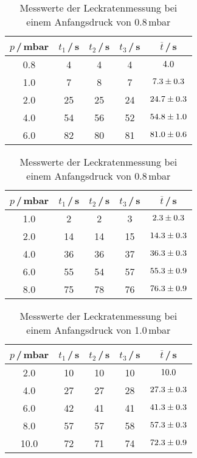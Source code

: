 \begin{table}
  \begin{minipage}{0.45\textwidth}
    \centering
    \caption{Messwerte der Leckratenmessung bei\\ einem Anfangsdruck von 0.6\,mbar}
    \begin{tabular}{c|c|c|c|c}
      $p$\,/\,mbar & $t_1$\,/\,s & $t_2$\,/\,s & $t_3$\,/\,s & $\overline{t}$\,/\,s \\
      \hline
      0.8 & 4  & 4  & 4  & $\num{4.0 +- 0.0}$ \\
      1.0 & 7  & 8  & 7  & $\num{7.3 +- 0.3}$ \\
      2.0 & 25 & 25 & 24 & $\num{24.7 +- 0.3}$ \\
      4.0 & 54 & 56 & 52 & $\num{54.8 +- 1.0}$ \\
      6.0 & 82 & 80 & 81 & $\num{81.0 +- 0.6}$ \\
    \end{tabular}
  \end{minipage}\hfill
  \begin{minipage}{0.45\textwidth}
    \centering
    \caption{Messwerte der Leckratenmessung bei\\ einem Anfangsdruck von 0.8\,mbar}
    \begin{tabular}{c|c|c|c|c}
      $p$\,/\,mbar & $t_1$\,/\,s & $t_2$\,/\,s & $t_3$\,/\,s & $\overline{t}$\,/\,s \\
      \hline
      1.0 & 2  & 2  & 3  & $\num{2.3 +- 0.3}$ \\
      2.0 & 14 & 14 & 15 & $\num{14.3 +- 0.3}$ \\
      4.0 & 36 & 36 & 37 & $\num{36.3 +- 0.3}$ \\
      6.0 & 55 & 54 & 57 & $\num{55.3 +- 0.9}$ \\
      8.0 & 75 & 78 & 76 & $\num{76.3 +- 0.9}$ \\
    \end{tabular}
  \end{minipage}
\end{table}

\begin{table}
  \centering
  \caption{Messwerte der Leckratenmessung bei\\ einem Anfangsdruck von 1.0\,mbar}
  \begin{tabular}{c|c|c|c|c}
    $p$\,/\,mbar & $t_1$\,/\,s & $t_2$\,/\,s & $t_3$\,/\,s & $\overline{t}$\,/\,s \\
    \hline
    2.0  & 10 & 10 & 10 & $\num{10.0 +- 0.0}$ \\
    4.0  & 27 & 27 & 28 & $\num{27.3 +- 0.3}$ \\
    6.0  & 42 & 41 & 41 & $\num{41.3 +- 0.3}$ \\
    8.0  & 57 & 57 & 58 & $\num{57.3 +- 0.3}$ \\
    10.0 & 72 & 71 & 74 & $\num{72.3 +- 0.9}$ \\
  \end{tabular}
\end{table}


